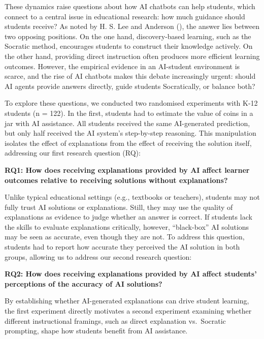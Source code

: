 \documentclass[
  11pt,
]{article}
\begin{document}
These dynamics raise questions about how AI chatbots can help students, which connect to a central issue in educational research: how much guidance should students receive? As noted by H. S. Lee and Anderson (), the answer lies between two opposing positions. On the one hand, discovery-based learning, such as the Socratic method, encourages students to construct their knowledge actively. On the other hand, providing direct instruction often produces more efficient learning outcomes. However, the empirical evidence in an AI-student environment is scarce, and the rise of AI chatbots makes this debate increasingly urgent: should AI agents provide answers directly, guide students Socratically, or balance both?

To explore these questions, we conducted two randomised experiments with K-12 students (n = 122). In the first, students had to estimate the value of coins in a jar with AI assistance. All students received the same AI-generated prediction, but only half received the AI system's step-by-step reasoning. This manipulation isolates the effect of explanations from the effect of receiving the solution itself, addressing our first research question (RQ):

\textbf{RQ1: How does receiving explanations provided by AI affect learner outcomes relative to receiving solutions without explanations?}

Unlike typical educational settings (e.g., textbooks or teachers), students may not fully trust AI solutions or explanations. Still, they may use the quality of explanations as evidence to judge whether an answer is correct. If students lack the skills to evaluate explanations critically, however, ``black-box'' AI solutions may be seen as accurate, even though they are not. To address this question, students had to report how accurate they perceived the AI solution in both groups, allowing us to address our second research question:

\textbf{RQ2: How does receiving explanations provided by AI affect students' perceptions of the accuracy of AI solutions?}

By establishing whether AI-generated explanations can drive student learning, the first experiment directly motivates a second experiment examining whether different instructional framings, such as direct explanation vs.~Socratic prompting, shape how students benefit from AI assistance.
\end{document}
